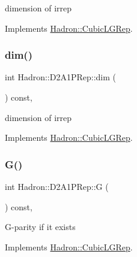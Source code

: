 dimension of irrep 

Implements \mbox{\hyperlink{structHadron_1_1CubicLGRep_a3acbaea26503ed64f20df693a48e4cdd}{Hadron\+::\+Cubic\+L\+G\+Rep}}.

\mbox{\label{structHadron_1_1D2A1PRep_a662b1c07136e38264b71c20d97f232ce}} 
\subsubsection{\texorpdfstring{dim()}{dim()}\hspace{0.1cm}{\footnotesize\ttfamily [2/2]}}
{\footnotesize\ttfamily int Hadron\+::\+D2\+A1\+P\+Rep\+::dim (\begin{DoxyParamCaption}{ }\end{DoxyParamCaption}) const\hspace{0.3cm}{\ttfamily [inline]}, {\ttfamily [virtual]}}

dimension of irrep 

Implements \mbox{\hyperlink{structHadron_1_1CubicLGRep_a3acbaea26503ed64f20df693a48e4cdd}{Hadron\+::\+Cubic\+L\+G\+Rep}}.

\mbox{\label{structHadron_1_1D2A1PRep_a624a76654139bb65156e67aeb663c84c}} 
\subsubsection{\texorpdfstring{G()}{G()}\hspace{0.1cm}{\footnotesize\ttfamily [1/2]}}
{\footnotesize\ttfamily int Hadron\+::\+D2\+A1\+P\+Rep\+::G (\begin{DoxyParamCaption}{ }\end{DoxyParamCaption}) const\hspace{0.3cm}{\ttfamily [inline]}, {\ttfamily [virtual]}}

G-\/parity if it exists 

Implements \mbox{\hyperlink{structHadron_1_1CubicLGRep_ace26f7b2d55e3a668a14cb9026da5231}{Hadron\+::\+Cubic\+L\+G\+Rep}}.

\mbox{\label{structHadron_1_1D2A1PRep_a624a76654139bb65156e67aeb663c84c}} 
